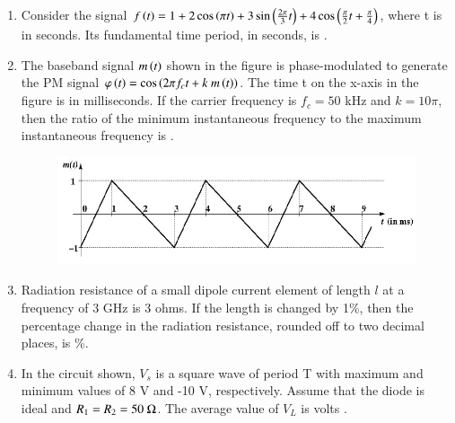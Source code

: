 \documentclass[a4paper, 11pt]{article}
\begin{document}
\begin{enumerate}
    \hfill{}

    \item Consider the signal $f\left(t\right)=1+2\cos\left(\pi t\right)+3\sin\left(\frac{2\pi}{3}t\right)+4\cos\left(\frac{\pi}{2}t+\frac{\pi}{4}\right)$, where t is in seconds. Its fundamental time period, in seconds, is \underline{\hspace{2cm}}.
    
    \hfill{}

    \item The baseband signal $m\left(t\right)$ shown in the figure is phase-modulated to generate the PM signal $\varphi\left(t\right)=\cos\left(2\pi f_{c}t+k~m\left(t\right)\right)$. The time t on the x-axis in the figure is in milliseconds. If the carrier frequency is $f_{c}=50$ kHz and $k=10\pi$, then the ratio of the minimum instantaneous frequency  to the maximum instantaneous frequency  is \underline{\hspace{2cm}} .
    
    \begin{figure}[H]
        \centering
        \includegraphics[width=\columnwidth]{figs/q22.png}
        \caption*{}
        \label{fig:q22}
    \end{figure}
    
    \hfill{}

    \item Radiation resistance of a small dipole current element of length $l$ at a frequency of 3 GHz is 3 ohms. If the length is changed by 1\%, then the percentage change in the radiation resistance, rounded off to two decimal places, is \underline{\hspace{2cm}}\%.
    
    \hfill{}

    \item In the circuit shown, $V_{s}$ is a square wave of period T with maximum and minimum values of 8 V and -10 V, respectively. Assume that the diode is ideal and $R_{1}=R_{2}=50~\ohm$. The average value of $V_{L}$ is \underline{\hspace{2cm}} volts .
    

\end{enumerate}
\end{document}
